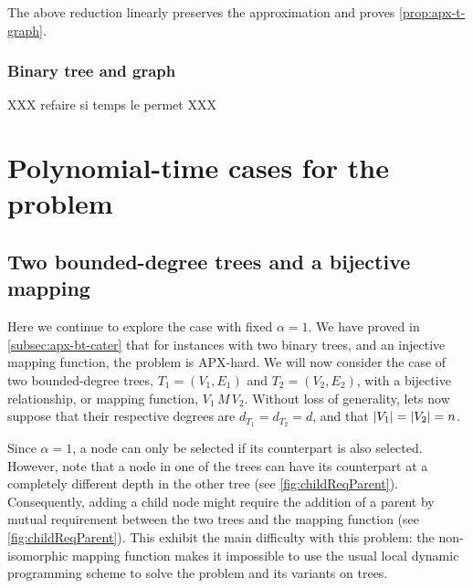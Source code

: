 		The above reduction linearly preserves the approximation and proves \cref{prop:apx-t-graph}.

		\subsubsection{Binary tree and graph}
		\label{subsubsec:binary-tree}

		XXX refaire si temps le permet XXX

	\section{Polynomial-time cases for the \mwccs{} problem}
	\label{sec:poly}

		\subsection{Two bounded-degree trees and a bijective mapping}
		\label{subsec:tree1o1}

			Here we continue to explore the case with fixed $\alpha = 1$.
			We have proved in \cref{subsec:apx-bt-cater} that for instances with two binary trees, and an injective mapping function, the problem is APX-hard.
			We will now consider the case of two bounded-degree trees, $T_1 = (V_1, E_1)$ and $T_2 = (V_2, E_2)$, with a bijective relationship, or mapping function, $V_1\,M\,V_2$. Without loss of generality, lets now suppose that their respective degrees are $d_{T_1} = d_{T_2} = d$, and that $\lvert V_1\rvert = \lvert V_2\rvert = n$.


			Since $\alpha=1$, a node can only be selected if its counterpart is also selected.
			However, note that a node in one of the trees %
			can have its counterpart at a completely different depth in the other tree %
			 (see \cref{fig:childReqParent}).
			Consequently, adding a child node might require the addition of a parent by mutual requirement between the two trees and the mapping function (see \cref{fig:childReqParent}).
			This exhibit the main difficulty with this problem: the non-isomorphic mapping function makes it impossible to use the usual local dynamic programming scheme to solve the \mwcs{} problem and its variants on trees.

